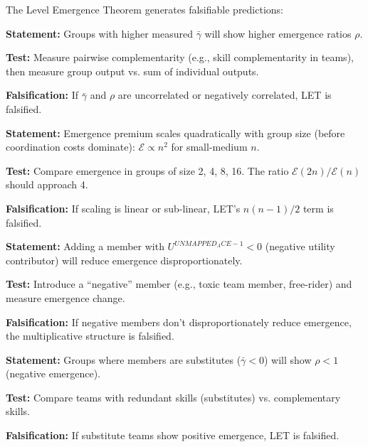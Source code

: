 The Level Emergence Theorem generates falsifiable predictions:

\begin{tcolorbox}[colback=green!5!white, colframe=green!75!black,
    title=Prediction LET-P1: Complementarity-Emergence Correlation]
\textbf{Statement:} Groups with higher measured $\bar{\gamma}$ will show
higher emergence ratios $\rho$.

\textbf{Test:} Measure pairwise complementarity (e.g., skill complementarity
in teams), then measure group output vs. sum of individual outputs.

\textbf{Falsification:} If $\bar{\gamma}$ and $\rho$ are uncorrelated or
negatively correlated, LET is falsified.
\end{tcolorbox}

\begin{tcolorbox}[colback=green!5!white, colframe=green!75!black,
    title=Prediction LET-P2: Quadratic Scaling]
\textbf{Statement:} Emergence premium scales quadratically with group size
(before coordination costs dominate):
$\mathcal{E} \propto n^2$ for small-medium $n$.

\textbf{Test:} Compare emergence in groups of size 2, 4, 8, 16. The
ratio $\mathcal{E}(2n)/\mathcal{E}(n)$ should approach 4.

\textbf{Falsification:} If scaling is linear or sub-linear, LET's
$n(n-1)/2$ term is falsified.
\end{tcolorbox}

\begin{tcolorbox}[colback=green!5!white, colframe=green!75!black,
    title=Prediction LET-P3: Negative Member Effect]
\textbf{Statement:} Adding a member with $U^{UNMAPPED_ACE-1} < 0$ (negative utility
contributor) will reduce emergence disproportionately.

\textbf{Test:} Introduce a ``negative'' member (e.g., toxic team member,
free-rider) and measure emergence change.

\textbf{Falsification:} If negative members don't disproportionately
reduce emergence, the multiplicative structure is falsified.
\end{tcolorbox}

\begin{tcolorbox}[colback=green!5!white, colframe=green!75!black,
    title=Prediction LET-P4: Substitutes Destroy Emergence]
\textbf{Statement:} Groups where members are substitutes ($\bar{\gamma} < 0$)
will show $\rho < 1$ (negative emergence).

\textbf{Test:} Compare teams with redundant skills (substitutes) vs.
complementary skills.

\textbf{Falsification:} If substitute teams show positive emergence,
LET is falsified.
\end{tcolorbox}


